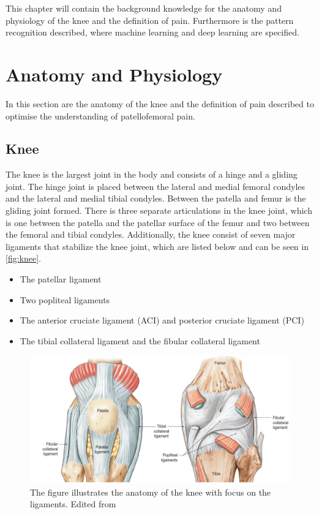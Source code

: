 This chapter will contain the background knowledge for the anatomy and physiology of the knee and the definition of pain. Furthermore is the pattern recognition described, where machine learning and deep learning are specified. 

\section{Anatomy and Physiology}
In this section are the anatomy of the knee and the definition of pain described to optimise the understanding of patellofemoral pain. 

\subsection{Knee}
The knee is the largest joint in the body and consists of a hinge and a gliding joint. The hinge joint is placed between the lateral and medial femoral condyles and the lateral and medial tibial condyles. Between the patella and femur is the gliding joint formed.
There is three separate articulations in the knee joint, which is one between the patella and the patellar surface of the femur and two between the femoral and tibial condyles. Additionally, the knee consist of seven major ligaments that stabilize the knee joint, which are listed below and can be seen in \autoref{fig:knee}.\citep{Martini2012} 

\begin{itemize}
\item The patellar ligament 
\item Two popliteal ligaments
\item The anterior cruciate ligament (ACI) and posterior cruciate ligament (PCI) 
\item The tibial collateral ligament and the fibular collateral ligament \citep{Martini2012}
\end{itemize}

\begin{figure} [H]
\centering
\includegraphics[width=1\textwidth]{figures/knee}
\caption{The figure illustrates the anatomy of the knee with focus on the ligaments. Edited from \citep{Martini2012}}
\label{fig:knee}
\end{figure}


